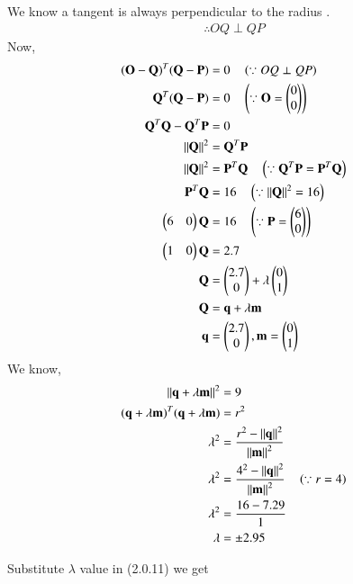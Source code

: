 \documentclass[journal,12pt,twocolumn]{IEEEtran}
\begin{document}
We know a tangent is always perpendicular to the radius .
\begin{align}
\therefore OQ \perp QP
\end{align}
Now,
\begin{align}
(\mathbf{O}-\mathbf{Q})^T (\mathbf{Q}-\mathbf{P}) &= 0 \quad \left(\because OQ \perp QP \right)
\\
\mathbf{Q}^T(\mathbf{Q}-\mathbf{P}) &= 0 \quad \left(\because \mathbf{O}=\begin{pmatrix}0\\0\end{pmatrix}\right)
\\
\mathbf{Q}^T \mathbf{Q} - \mathbf{Q}^T \mathbf{P} &= 0  
\\
\left\lVert\mathbf{Q}\right\rVert^2 &= \mathbf{Q}^T \mathbf{P}
\\
\left\lVert\mathbf{Q}\right\rVert^2 &= \mathbf{P}^T \mathbf{Q}  \quad \left(\because \mathbf{Q}^T \mathbf{P} = \mathbf{P}^T \mathbf{Q}\right)
\\
\mathbf{P}^T \mathbf{Q} &= 16 \quad \left(\because \left\lVert\mathbf{Q}\right\rVert^2 = 16\right)
\\
\begin{pmatrix}6&0\end{pmatrix} \mathbf{Q} &= 16 \quad \left(\because \mathbf{P} = \begin{pmatrix}6\\0\end{pmatrix} \right)
\\
\begin{pmatrix}1&0\end{pmatrix} \mathbf{Q} &= 2.7
\\
\mathbf{Q} &= \begin{pmatrix}2.7\\0\end{pmatrix} + \lambda \begin{pmatrix}0\\1\end{pmatrix}
\\
\mathbf{Q}&=\mathbf{q}+\lambda\mathbf{m}
\\
\mathbf{q}&=\begin{pmatrix}2.7\\ 0\end{pmatrix},\mathbf{m}=\begin{pmatrix}0\\1\end{pmatrix}
\end{align}
We know,
\begin{align}
\left\lVert\mathbf{q}+\lambda\mathbf{m}\right\rVert^2&=9
\\
(\mathbf{q}+\lambda \mathbf{m})^T(\mathbf{q}+\lambda \mathbf{m})&=r^2
\\
\lambda^2&=\frac{r^2-\left\lVert\mathbf{q}\right\rVert^2}{\left\lVert\mathbf{m}\right\rVert^2}
\\
\lambda^2&=\frac{4^2-\left\lVert\mathbf{q}\right\rVert^2}{\left\lVert\mathbf{m}\right\rVert^2} \quad \left(\because r=4\right)
\\
\lambda^2&=\frac{16-7.29}{1} 
\\
\lambda &= \pm 2.95
\end{align}

Substitute $\lambda$  value in (2.0.11) we get
\end{document}
